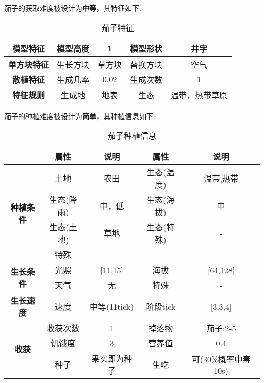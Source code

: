 茄子的获取难度被设计为\textbf{中等}，其特征如下:
\begin{table}[H]
    \centering
    \caption{茄子特征}
    \label{table:茄子特征}
    \setlength{\tabcolsep}{4mm}
    \begin{tabular}{c|cc|cc}
        \toprule
        \textbf{模型特征}   & 模型高度 & 1      & 模型形状 & 井字     \\
        \midrule
        \textbf{单方块特征} & 生长方块 & 草方块 & 替换方块 & 空气     \\
        \midrule
        \textbf{散植特征}   & 生成几率 & 0.02   & 生成次数 & 1        \\
        \midrule
        \textbf{特征规则}   & 生成地   & 地表   & 生态     & 温带，热带草原 \\
        \bottomrule
    \end{tabular}
\end{table}


茄子的种植难度被设计为\textbf{简单}，其种植信息如下:

\begin{table}[H]
    \centering
    \caption{茄子种植信息}
    \label{table:茄子种植信息}
    \setlength{\tabcolsep}{4mm}
    \begin{tabular}{c|cc|cc}
        \toprule
                                           & \textbf{属性} & \textbf{说明} & \textbf{属性} & \textbf{说明} \\
        \midrule
        \multirow{4}{*}{\textbf{种植条件}} & 土地          & 农田          & 生态(温度)    & 温带,热带    \\
                                           & 生态(降雨)    & 中，低        & 生态(海拔)    & 中            \\
                                           & 生态(土地)    & 草地          & 生态(特殊)    & -             \\
                                           & 特殊          & -                                             \\
        \midrule
        \multirow{2}{*}{\textbf{生长条件}} & 光照          & [11,15]        & 海拔          & [64,128]      \\
                                           & 天气          & 无            & 特殊          & -             \\
        \midrule
        \textbf{生长速度}                  & 速度          & 中等(11tick)     & 阶段tick      & [3,3,4]       \\
        \midrule
        \multirow{3}{*}{\textbf{收获}}     & 收获次数      & 1             & 掉落物        & 茄子:2-5      \\
                                           & 饥饿度        & 3             & 营养值        & 0.4           \\
                                           & 种子          & 果实即为种子  & 生吃          & 可(30\%概率中毒 10s) \\
        \bottomrule
    \end{tabular}
\end{table}


